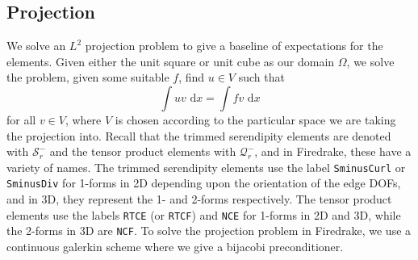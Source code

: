 \documentclass[format=acmsmall,screen,timestamp=false,a4paper]{acmart}
\newcommand\josh[1]{\textbf{\textcolor[rgb]{0,.5,1}{[Josh: #1]}}}
\begin{document}








\subsection{Projection}
  
We solve an $L^2$ projection problem to give a baseline of expectations for the elements. Given either the unit square or unit cube as our domain $\Omega$, we solve the problem, given some suitable $f$, find $u \in V$ such that
\begin{equation*}
  \int u v  \text{ d}x = \int f v \text{ d}x
\end{equation*}
for all $v \in V$, where $V$ is chosen according to the particular space we are taking the projection into.   Recall that the trimmed serendipity elements are denoted with $\mathcal{S}_r^-$ and the tensor product elements with $\mathcal{Q}^-_r$, and in Firedrake, these have a variety of names.  The trimmed serendipity elements use the label \texttt{SminusCurl} or \texttt{SminusDiv} for 1-forms in 2D depending upon the orientation of the edge DOFs, and in 3D, they represent the 1- and 2-forms respectively.  The tensor product elements use the labels \texttt{RTCE} (or \texttt{RTCF}) and  \texttt{NCE} for 1-forms in 2D and 3D, while the 2-forms in 3D are  \texttt{NCF}.  To solve the projection problem in Firedrake, we use a continuous galerkin scheme where we give a bijacobi preconditioner.  
\end{document}
